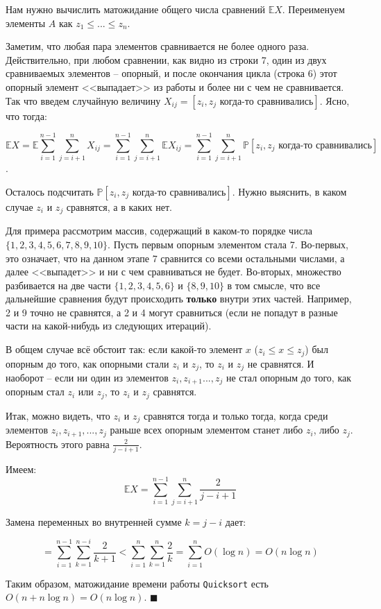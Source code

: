 Нам нужно вычислить матожидание общего числа сравнений $\mathbb E X$. Переименуем элементы $A$ как $z_1 \leq ... \leq z_n$.

Заметим, что любая пара элементов сравнивается не более одного раза. Действительно, при любом сравнении, как видно из строки 7, один из двух сравниваемых элементов -- опорный, и после окончания цикла (строка 6) этот опорный элемент <<выпадает>> из работы и более ни с чем не сравнивается. Так что введем случайную величину $X_{ij} = [z_i, z_j \text{ когда-то сравнивались}]$. Ясно, что тогда:

$$\mathbb E X = \mathbb E \sum_{i=1}^{n-1} \sum_{j=i+1}^n X_{ij} = \sum_{i=1}^{n-1} \sum_{j=i+1}^n \mathbb E X_{ij} = \sum_{i=1}^{n-1} \sum_{j=i+1}^n \mathbb P[z_i, z_j \text{ когда-то сравнивались}]$$.

Осталось подсчитать $\mathbb P[z_i, z_j\text{ когда-то сравнивались}]$. Нужно выяснить, в каком случае $z_i$ и $z_j$ сравнятся, а в каких нет.

Для примера рассмотрим массив, содержащий в каком-то порядке числа $\{1,2,3,4,5,6,7,8,9,10\}$. Пусть первым опорным элементом стала 7. Во-первых, это означает, что на данном этапе 7 сравнится со всеми остальными числами, а далее <<выпадет>> и ни с чем сравниваться не будет. Во-вторых, множество разбивается на две части $\{1,2,3,4,5,6\}$ и $\{8,9,10\}$ в том смысле, что все дальнейшие сравнения будут происходить \textbf{только} внутри этих частей. Например, 2 и 9 точно не сравнятся, а 2 и 4 могут сравниться (если не попадут в разные части на какой-нибудь из следующих итераций). 

В общем случае всё обстоит так: если какой-то элемент $x$ ($z_i \leq x \leq z_j$) был опорным до того, как опорными стали $z_i$ и $z_j$, то $z_i$ и $z_j$ не сравнятся. И наоборот -- если ни один из элементов $z_i, z_{i+1}..., z_j$ не стал опорным до того, как опорным стал $z_i$ или $z_j$, то $z_i$ и $z_j$ сравнятся.

Итак, можно видеть, что $z_i$ и $z_j$ сравнятся тогда и только тогда, когда среди элементов $z_i, z_{i+1}, ..., z_j$ раньше всех опорным элементом станет либо $z_i$, либо $z_j$. Вероятность этого равна $\frac{2}{j-i+1}$.

Имеем: $$\mathbb E X = \sum_{i=1}^{n-1} \sum_{j=i+1}^n \frac{2}{j-i+1}$$

Замена переменных во внутренней сумме $k = j-i$ дает:

$$ = \sum_{i=1}^{n-1} \sum_{k=1}^{n-i} \frac{2}{k+1} < \sum_{i=1}^n \sum_{k=1}^n \frac{2}{k} = \sum_{i=1}^n O(\log n) = O(n \log n)$$

Таким образом, матожидание времени работы \texttt{Quicksort} есть $O(n+n\log n) = O(n\log n)$. $\blacksquare$